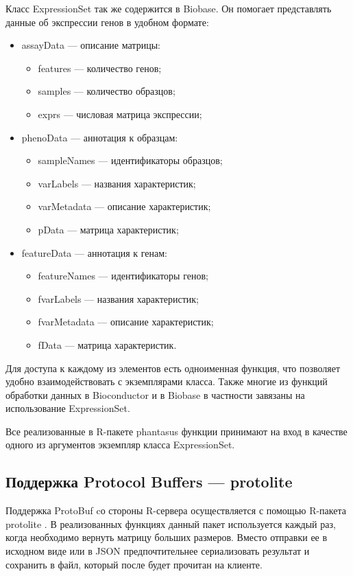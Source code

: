 \documentclass[specification,annotation]{itmo-student-thesis}
\begin{document}
Класс ExpressionSet \cite{expressionset} так же содержится в Biobase. Он помогает представлять данные об экспрессии генов в удобном формате:
\begin{itemize}
\item assayData --- описание матрицы:\begin{itemize}
\item features --- количество генов;
\item samples --- количество образцов;
\item exprs --- числовая матрица экспрессии; \end{itemize}
\item phenoData --- аннотация к образцам:\begin{itemize}
\item sampleNames --- идентификаторы образцов;
\item varLabels --- названия характеристик;
\item varMetadata --- описание характеристик;
\item pData --- матрица характеристик;\end{itemize}
\item featureData --- аннотация к генам:\begin{itemize}
\item featureNames --- идентификаторы генов;
\item fvarLabels --- названия характеристик;
\item fvarMetadata --- описание характеристик;
\item fData --- матрица характеристик.\end{itemize}
\end{itemize}

Для доступа к каждому из элементов есть одноименная функция, что позволяет удобно взаимодействовать с экземплярами класса. Также многие из функций обработки данных в Bioconductor и в Biobase в частности завязаны на использование ExpressionSet.

Все реализованные в R-пакете phantasus функции принимают на вход в качестве одного из аргументов экземпляр класса ExpressionSet.

\subsection{Поддержка Protocol Buffers --- protolite}
Поддержка ProtoBuf cо стороны R-сервера осуществляется с помощью R-пакета protolite \cite{protolite}. В реализованных функциях данный пакет используется каждый раз, когда необходимо вернуть матрицу больших размеров. Вместо отправки ее в исходном виде или в JSON предпочтительнее сериализовать результат и сохранить в файл, который после будет прочитан на клиенте.
\end{document}
